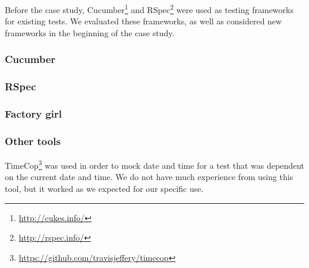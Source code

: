 
\label{sec:ruby_test}

Before the case study, Cucumber\footnote{\url{http://cukes.info/}} and
RSpec\footnote{\url{http://rspec.info/}} were used as testing frameworks
for existing tests. We evaluated these frameworks, as well as considered
new frameworks in the beginning of the case study.\\

\subsubsection{Cucumber}


\subsubsection{RSpec}


\subsubsection{Factory girl}


\subsubsection{Other tools}

TimeCop\footnote{\url{https://github.com/travisjeffery/timecop}} was
used in order to mock date and time for a test that was dependent on the
current date and time. We do not have much experience from using this
tool, but it worked as we expected for our specific use.\\

